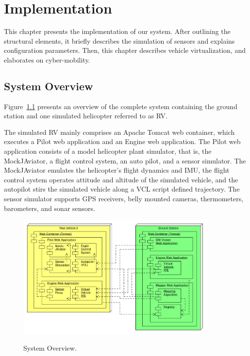 
\chapter{Implementation}

This chapter presents the implementation of our system.
After outlining the structural elements, it briefly describes the simulation of sensors and explains
configuration parameters. Then, this chapter describes vehicle virtualization, and elaborates on cyber-mobility.

\section{System Overview}

Figure~\ref{fig:SystemOverview} presents an overview of the complete system containing
the ground station and one simulated helicopter referred to as \ac{RV}.

The simulated \ac{RV} mainly comprises an Apache Tomcat web container, which executes a
Pilot web application and an Engine web application.
%
The Pilot web application consists of a model helicopter plant simulator, that is, the MockJAviator,
a flight control system, an auto pilot, and a sensor simulator.
The MockJAviator emulates the helicopter's flight dynamics and \ac{IMU},
the flight control system operates attitude and altitude of the simulated vehicle, 
and the autopilot stirs the simulated vehicle along a \ac{VCL} script defined trajectory.
The sensor simulator supports GPS receivers, belly mounted cameras, thermometers, barometers,
and sonar sensors.
\begin{figure}[h]
	\begin{center}
		{\includegraphics[width=10cm]{SystemOverview.pdf}}
	\end{center}
	\caption{System Overview.\label{fig:SystemOverview}}
\end{figure}


